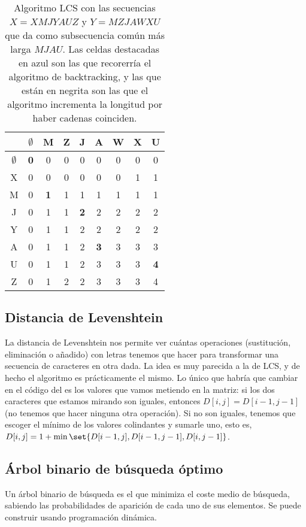\documentclass[palatino, nochap]{apuntes}
\begin{document}
\begin{table}[hbtp]
\centering
\begin{tabular}{|c|c|c|c|c|c|c|c|c|}
\toprule & $\emptyset$ & M & Z & J & A & W & X & U \\ \toprule
$\emptyset$ & \cellcolor{blue!25}\textbf{0} & 0 & 0 & 0 & 0 & 0 & 0 & 0 \\ \midrule
X & \cellcolor{blue!25}0 & 0 & 0 & 0 & 0 & 0 & 1 & 1 \\ \midrule
M & 0 & \cellcolor{blue!25}\textbf{1} & \cellcolor{blue!25}1 & 1 & 1 & 1 & 1 & 1 \\ \midrule
J & 0 & 1 & 1 & \cellcolor{blue!25}\textbf{2} & 2 & 2 & 2 & 2 \\ \midrule
Y & 0 & 1 & 1 & \cellcolor{blue!25}2 & 2 & 2 & 2 & 2 \\ \midrule
A & 0 & 1 & 1 & 2 & \cellcolor{blue!25}\textbf{3} & \cellcolor{blue!25}3 & \cellcolor{blue!25}3 & 3 \\ \midrule
U & 0 & 1 & 1 & 2 & 3 & 3 & 3 & \cellcolor{blue!25}\textbf{4} \\ \midrule
Z & 0 & 1 & 2 & 2 & 3 & 3 & 3 & \cellcolor{blue!25}4 \\ \bottomrule
\end{tabular}
\caption{Algoritmo LCS con las secuencias $X = XMJYAUZ$ y $Y = MZJAWXU$ que da como subsecuencia común más larga $MJAU$. Las celdas destacadas en azul son las que recorerría el algoritmo de backtracking, y las que están en negrita son las que el algoritmo incrementa la longitud por haber cadenas coinciden.}
\label{tab:LCS}
\end{table}


\subsection{Distancia de Levenshtein}

La distancia de Levenshtein nos permite ver cuántas operaciones (sustitución, eliminación o añadido) con letras tenemos que hacer para transformar una secuencia de caracteres en otra dada. La idea es muy parecida a la de LCS, y de hecho el algoritmo es prácticamente el mismo. Lo único que habría que cambiar en el código del  es los valores que vamos metiendo en la matriz: si los dos caracteres que estamos mirando son iguales, entonces $D[i,j] = D[i-1, j-1]$ (no tenemos que hacer ninguna otra operación). Si no son iguales, tenemos que escoger el mínimo de los valores colindantes y sumarle uno, esto es, $D[i,j] = 1 + \min \set{D[i-1, j], D[i-1, j-1], D[i, j-1]}$.

\subsection{Árbol binario de búsqueda óptimo}

Un árbol binario de búsqueda es el que minimiza el coste medio de búsqueda, sabiendo las probabilidades de aparición de cada uno de sus elementos. Se puede construir usando programación dinámica.

\printindex
\end{document}
